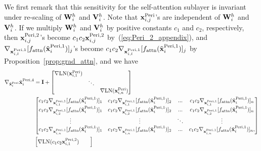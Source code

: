 \documentclass[journal]{IEEEtran}
\newcommand{\bfI}{{\bf I}}
\newcommand{\bfV}{{\bf V}}
\newcommand{\bfW}{{\bf W}}
\newcommand{\bfx}{{\bf x}}
\theoremstyle{plain}
\theoremstyle{definition}
\theoremstyle{remark}
\begin{document}
We first remark that this sensitivity for the self-attention sublayer is invariant under re-scaling of $\bfW_{i}^{h}$ and $\bfV_{i}^{h}$. Note that $\bfx^{{\rm Peri}}_{i, j}$'s are independent of $\bfW_{i}^{h}$ and $\bfV_{i}^{h}$. If we multiply $\bfW_{i}^{h}$ and $\bfV_{i}^{h}$ by positive constants $c_1$ and $c_2$, respectively, then ${\bfx}^{{\rm Peri}, 2}_{i,j}$'s become $c_1 c_2 {\bfx}^{{\rm Peri}, 2}_{i,j}$ by~(\ref{eq:Peri_2_appendix}), and $\nabla_{\bfx^{{\rm Peri},1}_{i, l}} [f_{\rm attn}(\tilde{\bfx}^{{\rm Peri},1}_{i})]_j$'s become $c_1 c_2 \nabla_{\bfx^{{\rm Peri},1}_{i, l}} [f_{\rm attn}(\tilde{\bfx}^{{\rm Peri},1}_{i})]_j$ by Proposition~\ref{prop:grad_attn}, and we have
\begin{align}
    \nabla_{\tilde{\bfx}_i^{{\rm Peri}}} \tilde{\bfx}_i^{{\rm Peri}, 4} 
    &= \bfI + \begin{bmatrix}
\nabla {\rm LN}(\bfx^{{\rm Peri}}_{i, 1}) &        &        \\
                 & \ddots &        \\
                 &        & \nabla {\rm LN}(\bfx^{{\rm Peri}}_{i, n})
\end{bmatrix} \\ &
\begin{bmatrix}
c_1 c_2 \nabla_{\bfx^{{\rm Peri},1}_{i, 1}} [f_{\rm attn}(\tilde{\bfx}^{{\rm Peri},1}_{i})]_1 & c_1 c_2 \nabla_{\bfx^{{\rm Peri},1}_{i, 1}} [f_{\rm attn}(\tilde{\bfx}^{{\rm Peri},1}_{i})]_2  & ...    &  c_1 c_2  \nabla_{\bfx^{{\rm Peri},1}_{i, 1}} [f_{\rm attn}(\tilde{\bfx}^{{\rm Peri},1}_{i})]_n    \\
c_1 c_2 \nabla_{\bfx^{{\rm Peri},1}_{i, 2}} [f_{\rm attn}(\tilde{\bfx}^{{\rm Peri},1}_{i})]_1 & c_1 c_2 \nabla_{\bfx^{{\rm Peri},1}_{i, 2}} [f_{\rm attn}(\tilde{\bfx}^{{\rm Peri},1}_{i})]_2  & ...    &  c_1 c_2  \nabla_{\bfx^{{\rm Peri},1}_{i, 2}} [f_{\rm attn}(\tilde{\bfx}^{{\rm Peri},1}_{i})]_n    \\
     \vdots        &  \vdots  & \ddots &    \vdots    \\
c_1 c_2 \nabla_{\bfx^{{\rm Peri},1}_{i, n}} [f_{\rm attn}(\tilde{\bfx}^{{\rm Peri},1}_{i})]_1 & c_1 c_2 \nabla_{\bfx^{{\rm Peri},1}_{i, n}} [f_{\rm attn}(\tilde{\bfx}^{{\rm Peri},1}_{i})]_2  & ...    &  c_1 c_2  \nabla_{\bfx^{{\rm Peri},1}_{i, n}} [f_{\rm attn}(\tilde{\bfx}^{{\rm Peri},1}_{i})]_n,   
\end{bmatrix}\\ 
& \begin{bmatrix}
\nabla {\rm LN}(c_1 c_2 \bfx^{{\rm Peri}, 2}_{i, 1}) &        &        \\

\end{bmatrix}
\end{align}
\end{document}
